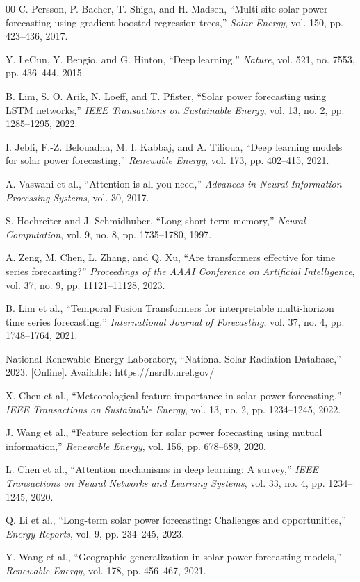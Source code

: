 \documentclass[conference]{IEEEtran}
\begin{document}
\begin{thebibliography}{00}
 C. Persson, P. Bacher, T. Shiga, and H. Madsen, ``Multi-site solar power forecasting using gradient boosted regression trees,'' \textit{Solar Energy}, vol. 150, pp. 423--436, 2017.

 Y. LeCun, Y. Bengio, and G. Hinton, ``Deep learning,'' \textit{Nature}, vol. 521, no. 7553, pp. 436--444, 2015.

 B. Lim, S. O. Arik, N. Loeff, and T. Pfister, ``Solar power forecasting using LSTM networks,'' \textit{IEEE Transactions on Sustainable Energy}, vol. 13, no. 2, pp. 1285--1295, 2022.

 I. Jebli, F.-Z. Belouadha, M. I. Kabbaj, and A. Tilioua, ``Deep learning models for solar power forecasting,'' \textit{Renewable Energy}, vol. 173, pp. 402--415, 2021.

 A. Vaswani et al., ``Attention is all you need,'' \textit{Advances in Neural Information Processing Systems}, vol. 30, 2017.

 S. Hochreiter and J. Schmidhuber, ``Long short-term memory,'' \textit{Neural Computation}, vol. 9, no. 8, pp. 1735--1780, 1997.

 A. Zeng, M. Chen, L. Zhang, and Q. Xu, ``Are transformers effective for time series forecasting?'' \textit{Proceedings of the AAAI Conference on Artificial Intelligence}, vol. 37, no. 9, pp. 11121--11128, 2023.

 B. Lim et al., ``Temporal Fusion Transformers for interpretable multi-horizon time series forecasting,'' \textit{International Journal of Forecasting}, vol. 37, no. 4, pp. 1748--1764, 2021.

 National Renewable Energy Laboratory, ``National Solar Radiation Database,'' 2023. [Online]. Available: https://nsrdb.nrel.gov/

 X. Chen et al., ``Meteorological feature importance in solar power forecasting,'' \textit{IEEE Transactions on Sustainable Energy}, vol. 13, no. 2, pp. 1234--1245, 2022.

 J. Wang et al., ``Feature selection for solar power forecasting using mutual information,'' \textit{Renewable Energy}, vol. 156, pp. 678--689, 2020.

 L. Chen et al., ``Attention mechanisms in deep learning: A survey,'' \textit{IEEE Transactions on Neural Networks and Learning Systems}, vol. 33, no. 4, pp. 1234--1245, 2020.

 Q. Li et al., ``Long-term solar power forecasting: Challenges and opportunities,'' \textit{Energy Reports}, vol. 9, pp. 234--245, 2023.

 Y. Wang et al., ``Geographic generalization in solar power forecasting models,'' \textit{Renewable Energy}, vol. 178, pp. 456--467, 2021.

\end{thebibliography}
\end{document}
